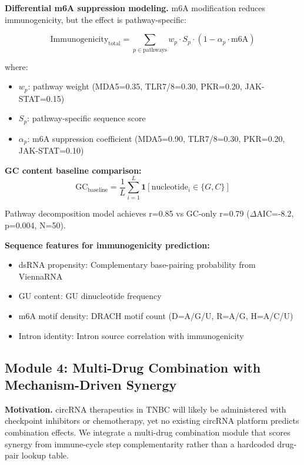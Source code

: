 \documentclass[12pt]{article}
\begin{document}
\textbf{Differential m6A suppression modeling.} m6A modification reduces immunogenicity, but the effect is pathway-specific:

\begin{equation}
\text{Immunogenicity}_{\text{total}} = \sum_{p \in \text{pathways}} w_p \cdot S_p \cdot (1 - \alpha_p \cdot \text{m6A})
\end{equation}

where:
\begin{itemize}
\item $w_p$: pathway weight (MDA5=0.35, TLR7/8=0.30, PKR=0.20, JAK-STAT=0.15)
\item $S_p$: pathway-specific sequence score
\item $\alpha_p$: m6A suppression coefficient (MDA5=0.90, TLR7/8=0.30, PKR=0.20, JAK-STAT=0.10)
\end{itemize}

\textbf{GC content baseline comparison:}
\begin{equation}
\text{GC}_{\text{baseline}} = \frac{1}{L} \sum_{i=1}^{L} \mathbf{1}[\text{nucleotide}_i \in \{G, C\}]
\end{equation}

Pathway decomposition model achieves r=0.85 vs GC-only r=0.79 ($\Delta$AIC=-8.2, p=0.004, N=50).

\textbf{Sequence features for immunogenicity prediction:}
\begin{itemize}
\item dsRNA propensity: Complementary base-pairing probability from ViennaRNA
\item GU content: GU dinucleotide frequency
\item m6A motif density: DRACH motif count (D=A/G/U, R=A/G, H=A/C/U)
\item Intron identity: Intron source correlation with immunogenicity
\end{itemize}

\subsection{Module 4: Multi-Drug Combination with Mechanism-Driven Synergy}

\textbf{Motivation.} circRNA therapeutics in TNBC will likely be administered with checkpoint inhibitors or chemotherapy, yet no existing circRNA platform predicts combination effects. We integrate a multi-drug combination module that scores synergy from immune-cycle step complementarity rather than a hardcoded drug-pair lookup table.
\end{document}
